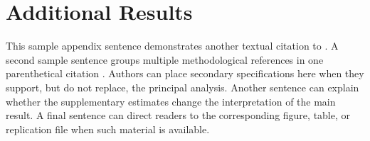 \section{Additional Results}
\label{app:results}

This sample appendix sentence demonstrates another textual citation to . A second sample sentence groups multiple methodological references in one parenthetical citation . Authors can place secondary specifications here when they support, but do not replace, the principal analysis. Another sentence can explain whether the supplementary estimates change the interpretation of the main result. A final sentence can direct readers to the corresponding figure, table, or replication file when such material is available.

